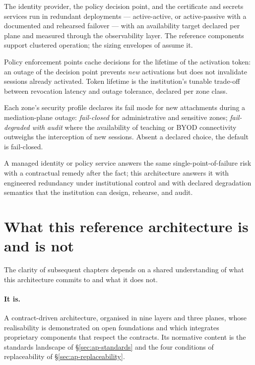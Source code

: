 \begin{description}[leftmargin=1.5em,style=nextline,nosep]
  \item[Redundant deployment per critical plane.] The identity
    provider, the policy decision point, and the certificate and
    secrets services run in redundant deployments --- active-active,
    or active-passive with a documented and rehearsed failover ---
    with an availability target declared per plane and measured
    through the observability layer. The reference components
    support clustered operation; the sizing envelopes of
     assume it.
  \item[A policy-plane outage must not interrupt established work.]
    Policy enforcement points cache decisions for the lifetime of
    the activation token: an outage of the decision point prevents
    \emph{new} activations but does not invalidate sessions already
    activated. Token lifetime is the institution's tunable
    trade-off between revocation latency and outage tolerance,
    declared per zone class.
  \item[Fail-mode policy per zone class.] Each zone's security
    profile declares its fail mode for new attachments during a
    mediation-plane outage: \emph{fail-closed} for administrative
    and sensitive zones; \emph{fail-degraded with audit} where the
    availability of teaching or BYOD connectivity outweighs the
    interception of new sessions. Absent a declared choice, the
    default is fail-closed.
  \item[The commercial-SLA comparison.] A managed identity or
    policy service answers the same single-point-of-failure risk
    with a contractual remedy after the fact; this architecture
    answers it with engineered redundancy under institutional
    control and with declared degradation semantics that the
    institution can design, rehearse, and audit.
\end{description}

\section{What this reference architecture is and is not}
\label{sec:ap-scope}

The clarity of subsequent chapters depends on a shared understanding
of what this architecture commits to and what it does not.

\paragraph{It is.} A contract-driven architecture, organised in nine
layers and three planes, whose realisability is demonstrated on open
foundations and which integrates proprietary components that respect
the contracts. Its normative content is the standards landscape of
\S\ref{sec:ap-standards} and the four conditions of replaceability of
\S\ref{sec:ap-replaceability}.

